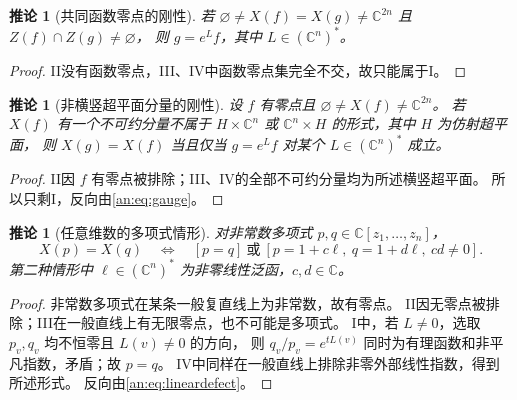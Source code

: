 \documentclass[11pt,a4paper,oneside,openany]{book}
\theoremstyle{lecture}
\newtheorem{corollary}[theorem]{推论}
\newcommand{\C}{\mathbb C}
\numberwithin{equation}{section}
\begin{document}
\begin{corollary}[共同函数零点的刚性]\label{an:cor:common-high}
若 $\varnothing\ne X(f)=X(g)\ne\C^{2n}$ 且 $Z(f)\cap Z(g)\ne\varnothing$，
则 $g=e^L f$，其中 $L\in(\C^n)^*$。
\end{corollary}
\begin{proof}
II没有函数零点，III、IV中函数零点集完全不交，故只能属于I。
\end{proof}

\begin{corollary}[非横竖超平面分量的刚性]\label{an:cor:nonaxis}
设 $f$ 有零点且 $\varnothing\ne X(f)\ne\C^{2n}$。
若 $X(f)$ 有一个不可约分量不属于
$H\times\C^n$ 或 $\C^n\times H$ 的形式，其中 $H$ 为仿射超平面，
则 $X(g)=X(f)$ 当且仅当 $g=e^L f$ 对某个 $L\in(\C^n)^*$ 成立。
\end{corollary}
\begin{proof}
II因 $f$ 有零点被排除；III、IV的全部不可约分量均为所述横竖超平面。
所以只剩I，反向由\eqref{an:eq:gauge}。
\end{proof}

\begin{corollary}[任意维数的多项式情形]\label{an:cor:polynomial}
对非常数多项式 $p,q\in\C[z_1,\ldots,z_n]$，
\[
 X(p)=X(q)\quad\Longleftrightarrow\quad
 \left[p=q\right]\ \text{或}\
 \left[p=1+c\ell,\ q=1+d\ell,\ cd\ne0\right].
\]
第二种情形中 $\ell\in(\C^n)^*$ 为非零线性泛函，$c,d\in\C$。
\end{corollary}
\begin{proof}
非常数多项式在某条一般复直线上为非常数，故有零点。
II因无零点被排除；III在一般直线上有无限零点，也不可能是多项式。
I中，若 $L\ne0$，选取 $p_v,q_v$ 均不恒零且 $L(v)\ne0$ 的方向，
则 $q_v/p_v=e^{tL(v)}$ 同时为有理函数和非平凡指数，矛盾；故 $p=q$。
IV中同样在一般直线上排除非零外部线性指数，得到所述形式。
反向由\eqref{an:eq:lineardefect}。
\end{proof}
\end{document}

